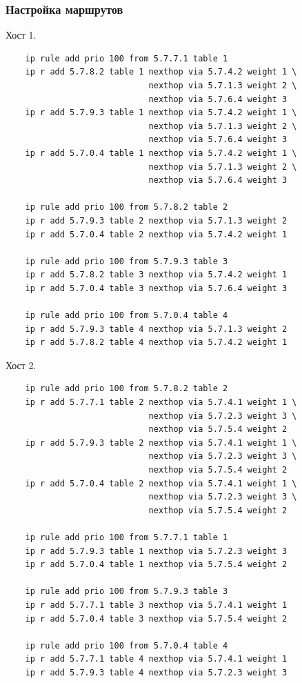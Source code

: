 \documentclass[11pt, a4paper] {ncc}
\begin{document}
        \subsubsection*{Настройка маршрутов}
		Хост 1.
            \begin{verbatim}
    ip rule add prio 100 from 5.7.7.1 table 1
    ip r add 5.7.8.2 table 1 nexthop via 5.7.4.2 weight 1 \
                             nexthop via 5.7.1.3 weight 2 \
                             nexthop via 5.7.6.4 weight 3
    ip r add 5.7.9.3 table 1 nexthop via 5.7.4.2 weight 1 \
                             nexthop via 5.7.1.3 weight 2 \
                             nexthop via 5.7.6.4 weight 3
    ip r add 5.7.0.4 table 1 nexthop via 5.7.4.2 weight 1 \
                             nexthop via 5.7.1.3 weight 2 \
                             nexthop via 5.7.6.4 weight 3

    ip rule add prio 100 from 5.7.8.2 table 2
    ip r add 5.7.9.3 table 2 nexthop via 5.7.1.3 weight 2
    ip r add 5.7.0.4 table 2 nexthop via 5.7.4.2 weight 1

    ip rule add prio 100 from 5.7.9.3 table 3
    ip r add 5.7.8.2 table 3 nexthop via 5.7.4.2 weight 1
    ip r add 5.7.0.4 table 3 nexthop via 5.7.6.4 weight 3

    ip rule add prio 100 from 5.7.0.4 table 4
    ip r add 5.7.9.3 table 4 nexthop via 5.7.1.3 weight 2
    ip r add 5.7.8.2 table 4 nexthop via 5.7.4.2 weight 1
            \end{verbatim}
		Хост 2.
            \begin{verbatim}
    ip rule add prio 100 from 5.7.8.2 table 2
    ip r add 5.7.7.1 table 2 nexthop via 5.7.4.1 weight 1 \
                             nexthop via 5.7.2.3 weight 3 \
                             nexthop via 5.7.5.4 weight 2
    ip r add 5.7.9.3 table 2 nexthop via 5.7.4.1 weight 1 \
                             nexthop via 5.7.2.3 weight 3 \
                             nexthop via 5.7.5.4 weight 2
    ip r add 5.7.0.4 table 2 nexthop via 5.7.4.1 weight 1 \
                             nexthop via 5.7.2.3 weight 3 \
                             nexthop via 5.7.5.4 weight 2

    ip rule add prio 100 from 5.7.7.1 table 1
    ip r add 5.7.9.3 table 1 nexthop via 5.7.2.3 weight 3 
    ip r add 5.7.0.4 table 1 nexthop via 5.7.5.4 weight 2

    ip rule add prio 100 from 5.7.9.3 table 3
    ip r add 5.7.7.1 table 3 nexthop via 5.7.4.1 weight 1
    ip r add 5.7.0.4 table 3 nexthop via 5.7.5.4 weight 2

    ip rule add prio 100 from 5.7.0.4 table 4
    ip r add 5.7.7.1 table 4 nexthop via 5.7.4.1 weight 1
    ip r add 5.7.9.3 table 4 nexthop via 5.7.2.3 weight 3 
            \end{verbatim}
\end{document}
